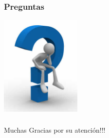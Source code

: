 \documentclass[a4paper]{beamer}
\begin{document}
\begin{frame}
\frametitle{Preguntas}
	\begin{center}
		\includegraphics[height=5cm]{image/preguntas.jpg}
	\end{center}
\end{frame}			

\begin{frame}
\frametitle{}
	\begin{center}
		Muchas Gracias por su atención!!!
	\end{center}
\end{frame}			
\end{document}
